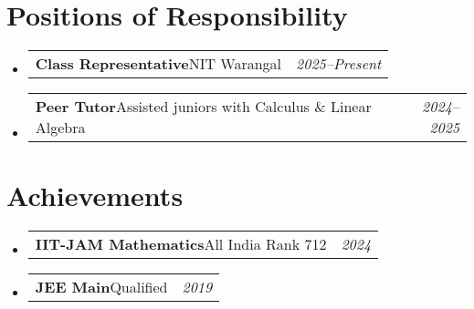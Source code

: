 \documentclass[a4paper,11pt]{article}
\makeatletter
\newcommand{\resumePOR}[3]{
\vspace{0.5mm}\item
    \begin{tabular*}{0.97\textwidth}[t]{l@{\extracolsep{\fill}}r}
        \textbf{#1}\hspace{0.3mm}#2 & \textit{\small{#3}} 
    \end{tabular*}
    \vspace{-2mm}
}
\newcommand{\resumeSubHeadingListStart}{\begin{itemize}[leftmargin=*,labelsep=0mm]}
\newcommand{\resumeSubHeadingListEnd}{\end{itemize}\vspace{2mm}}
\makeatother
\begin{document}
\section{\textbf{Positions of Responsibility}}
\resumeSubHeadingListStart
  \resumePOR{Class Representative}{NIT Warangal}{2025–Present}
  \resumePOR{Peer Tutor}{Assisted juniors with Calculus \& Linear Algebra}{2024–2025}
\resumeSubHeadingListEnd

\section{\textbf{Achievements}}
\resumeSubHeadingListStart
  \resumePOR{IIT-JAM Mathematics}{All India Rank 712}{2024}
  \resumePOR{JEE Main}{Qualified}{2019}
\resumeSubHeadingListEnd
\end{document}
